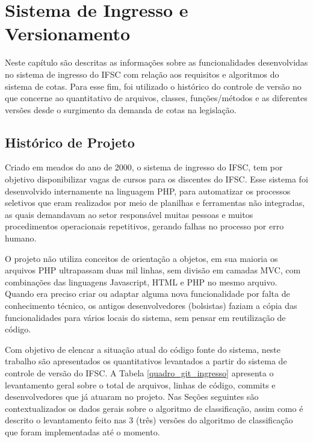 \chapter{Sistema de Ingresso e Versionamento}
\label{chap:historicoversoes}

Neste capítulo são descritas as informações sobre as funcionalidades desenvolvidas no sistema de ingresso do \gls{IFSC} com relação aos requisitos e algoritmos do sistema de cotas. Para esse fim, foi utilizado o histórico do controle de versão no que concerne ao quantitativo de arquivos, classes, funções/métodos e as diferentes versões desde o surgimento da demanda de cotas na legislação.

\section{Histórico de Projeto}
\label{historicopj}
Criado em meados do ano de 2000, o sistema de ingresso do \gls{IFSC}, tem por objetivo disponibilizar vagas de cursos para os discentes do \gls{IFSC}. Esse sistema foi desenvolvido internamente na linguagem PHP, para automatizar os processos seletivos que eram realizados por meio de planilhas e ferramentas não integradas, as quais demandavam ao setor responsável muitas pessoas e muitos procedimentos operacionais repetitivos, gerando falhas no processo por erro humano.

O projeto não utiliza conceitos de orientação a objetos, em sua maioria os arquivos PHP ultrapassam duas mil linhas, sem divisão em camadas \gls{MVC}, com combinações das linguagens Javascript, HTML e PHP no mesmo arquivo. Quando era preciso criar ou adaptar alguma nova funcionalidade por falta de conhecimento técnico, os antigos desenvolvedores (bolsistas) faziam a cópia das funcionalidades para vários locais do sistema, sem pensar em reutilização de código.

Com objetivo de elencar a situação atual do código fonte do sistema, neste trabalho são apresentados os quantitativos levantados a partir do sistema de controle de versão do \gls{IFSC}. A Tabela \ref{quadro_git_ingresso} apresenta o levantamento geral sobre o total de arquivos, linhas de código, commits e desenvolvedores que já atuaram no projeto. Nas Seções seguintes são contextualizados os dados gerais sobre o algoritmo de classificação, assim como é descrito o levantamento feito nas 3 (três) versões do algoritmo de classificação que foram implementadas até o momento.




